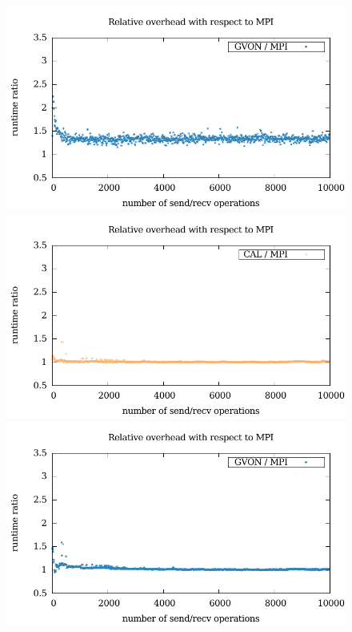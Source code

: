 \begin{figure}[H]
\begin{minipage}[t]{0.5\textwidth}
    \includegraphics[width=\textwidth]{plots/50_nsend_network_overhead_gvon_laser}
    \includegraphics[width=\textwidth]{plots/50_nsize_network_overhead_cal_laser}
    \includegraphics[width=\textwidth]{plots/50_nsize_network_overhead_gvon_laser}

\end{minipage}
\end{figure}
